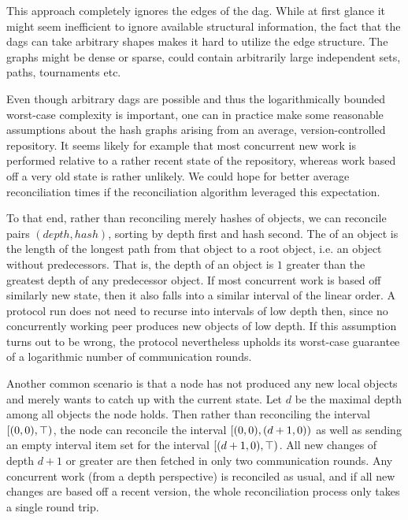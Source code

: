 This approach completely ignores the edges of the dag. While at first glance it might seem inefficient to ignore available structural information, the fact that the dags can take arbitrary shapes makes it hard to utilize the edge structure. The graphs might be dense or sparse, could contain arbitrarily large independent sets, paths, tournaments etc.

Even though arbitrary dags are possible and thus the logarithmically bounded worst-case complexity is important, one can in practice make some reasonable assumptions about the hash graphs arising from an average, version-controlled repository. It seems likely for example that most concurrent new work is performed relative to a rather recent state of the repository, whereas work based off a very old state is rather unlikely. We could hope for better average reconciliation times if the reconciliation algorithm leveraged this expectation.

To that end, rather than reconciling merely hashes of objects, we can reconcile pairs $(\mathit{depth}, \mathit{hash})$, sorting by depth first and hash second. The  of an object is the length of the longest path from that object to a root object, i.e. an object without predecessors. That is, the depth of an object is $1$ greater than the greatest depth of any predecessor object. If most concurrent work is based off similarly new state, then it also falls into a similar interval of the linear order. A protocol run does not need to recurse into intervals of low depth then, since no concurrently working peer produces new objects of low depth. If this assumption turns out to be wrong, the protocol nevertheless upholds its worst-case guarantee of a logarithmic number of communication rounds.

Another common scenario is that a node has not produced any new local objects and merely wants to catch up with the current state. Let $d$ be the maximal depth among all objects the node holds. Then rather than reconciling the interval $[{(0, 0)},{\top})_{}$, the node can reconcile the interval $[{(0, 0)},{(d + 1, 0)})_{}$ as well as sending an empty interval item set for the interval $[{(d + 1, 0)},{\top})_{}$. All new changes of depth $d + 1$ or greater are then fetched in only two communication rounds. Any concurrent work (from a depth perspective) is reconciled as usual, and if all new changes are based off a recent version, the whole reconciliation process only takes a single round trip.